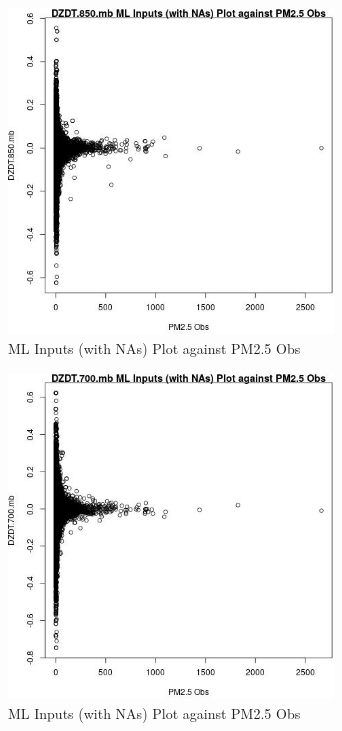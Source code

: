 \begin{figure} 
\centering  
\includegraphics[width=0.77\textwidth]{Code_Outputs/Report_ML_input_PM25_Step4_part_e_de_duplicated_aves_compiled_2019-05-20wNAs_DZDT850mbvPM25_Obs.jpg} 
\caption{\label{fig:Report_ML_input_PM25_Step4_part_e_de_duplicated_aves_compiled_2019-05-20wNAsDZDT850mbvPM25_Obs}ML Inputs (with NAs) Plot against PM2.5 Obs} 
\end{figure} 
 

\begin{figure} 
\centering  
\includegraphics[width=0.77\textwidth]{Code_Outputs/Report_ML_input_PM25_Step4_part_e_de_duplicated_aves_compiled_2019-05-20wNAs_DZDT700mbvPM25_Obs.jpg} 
\caption{\label{fig:Report_ML_input_PM25_Step4_part_e_de_duplicated_aves_compiled_2019-05-20wNAsDZDT700mbvPM25_Obs}ML Inputs (with NAs) Plot against PM2.5 Obs} 
\end{figure} 
 

